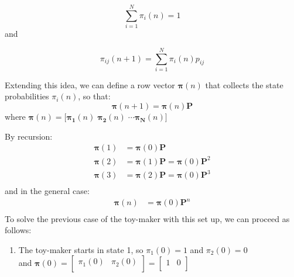 \documentclass[\main/main.tex]{subfiles}
\begin{document}
\begin{small}
\begin{equation}
    \sum_{i=1}^{N} \pi_i(n) = 1
\end{equation}
and 

\begin{equation}
    \pi_{ij}(n+1) = \sum_{i=1}^{N}\pi_i(n) p_{ij}
\end{equation}

\noindent Extending this idea, we can define a row vector $\bm{\pi}(n)$ that collects the state probabilities $\pi_i(n)$, so that:
\begin{equation}
   \bm{\pi }(n+1)= \bm{\pi}(n) \mathbf{P}
\end{equation}
where $\bm{\pi}(n) = \lbrack \bm{\pi_1}(n) \; \bm{\pi_2}(n) \; \cdots \bm{\pi_N}(n) \rbrack$ 

\noindent By recursion:
\begin{equation}
\begin{split}
   \bm{\pi}(1)&= \bm{\pi}(0) \bm{P} \\ 
   \bm{\pi }(2)&= \bm{\pi}(1) \bm{P} = \bm{\pi}(0) \bm{P}^2 \\ 
   \bm{\pi }(3)&= \bm{\pi}(2) \bm{P} = \bm{\pi}(0) \mathbf{P}^3\\
\end{split}
\end{equation}
and in the general case:
\begin{equation}
\begin{split}
   \bm{\pi}(n)&= \bm{\pi}(0) \mathbf{P}^n \\ 
\end{split}
\end{equation}
To solve the previous case of the toy-maker with this set up, we can proceed as follows:
\begin{enumerate}
    \item The toy-maker starts in state 1, so $\pi_1(0) = 1$ and $\pi_2(0) = 0$\\
    and $\bm{\pi}(0) = \begin{bmatrix}
    \pi_1(0) & \pi_2(0)\\
  \end{bmatrix}
 = \begin{bmatrix}
    1 & 0\\
  \end{bmatrix}$


\end{enumerate}
\end{small}
\end{document}
